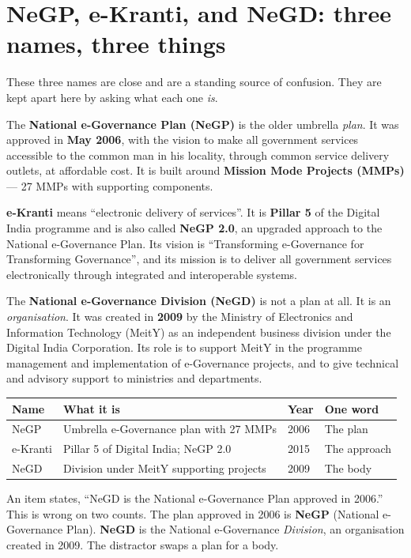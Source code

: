 \section{NeGP, e-Kranti, and NeGD: three names, three things}
These three names are close and are a standing source of confusion. They are
kept apart here by asking what each one \emph{is}.

The \textbf{National e-Governance Plan (NeGP)} is the older umbrella
\emph{plan}. It was approved in \textbf{May 2006}, with the vision to make
all government services accessible to the common man in his locality,
through common service delivery outlets, at affordable cost. It is built
around \textbf{Mission Mode Projects (MMPs)} --- 27 MMPs with supporting
components.

\textbf{e-Kranti} means ``electronic delivery of services''. It is
\textbf{Pillar 5} of the Digital India programme and is also called
\textbf{NeGP 2.0}, an upgraded approach to the National e-Governance Plan.
Its vision is ``Transforming e-Governance for Transforming Governance'',
and its mission is to deliver all government services electronically through
integrated and interoperable systems.

The \textbf{National e-Governance Division (NeGD)} is not a plan at all. It
is an \emph{organisation}. It was created in \textbf{2009} by the Ministry
of Electronics and Information Technology (MeitY) as an independent business
division under the Digital India Corporation. Its role is to support MeitY
in the programme management and implementation of e-Governance projects, and
to give technical and advisory support to ministries and departments.

\begin{center}
\begin{tabular}{p{}p{}p{}p{}}
\toprule
\textbf{Name} & \textbf{What it is} & \textbf{Year} & \textbf{One word} \\
\midrule
NeGP & Umbrella e-Governance plan with 27 MMPs & 2006 & The plan \\
e-Kranti & Pillar 5 of Digital India; NeGP 2.0 & 2015 & The approach \\
NeGD & Division under MeitY supporting projects & 2009 & The body \\
\bottomrule
\end{tabular}
\end{center}

\begin{example}
An item states, ``NeGD is the National e-Governance Plan approved in 2006.''
This is wrong on two counts. The plan approved in 2006 is \textbf{NeGP}
(National e-Governance Plan). \textbf{NeGD} is the National e-Governance
\emph{Division}, an organisation created in 2009. The distractor swaps a
plan for a body.
\end{example}

